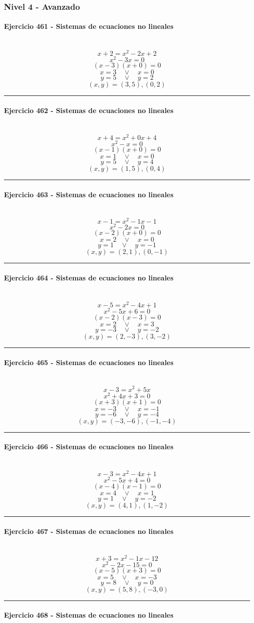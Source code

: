 \documentclass[10pt,a4paper]{article}
\newcommand{\res}[1]{\paragraph{#1}\mbox{}\\[-1.2em]}
\begin{document}
\subsubsection*{Nivel 4 - Avanzado}
\res{Ejercicio 461 - Sistemas de ecuaciones no lineales}
\[ x+2=x^2-2x+2 \]
\[ x^{2} - 3 x=0 \]
\[ (x-3)(x+0)=0 \]
\[ x=3\quad \vee \quad x=0 \]
\[ y=5\quad \vee \quad y=2 \]
\[ \boxed{(x,y)=(3,5),(0,2)} \]
\vspace{1mm}\hrule\vspace{2mm}
\res{Ejercicio 462 - Sistemas de ecuaciones no lineales}
\[ x+4=x^2+0x+4 \]
\[ x^{2} - x=0 \]
\[ (x-1)(x+0)=0 \]
\[ x=1\quad \vee \quad x=0 \]
\[ y=5\quad \vee \quad y=4 \]
\[ \boxed{(x,y)=(1,5),(0,4)} \]
\vspace{1mm}\hrule\vspace{2mm}
\res{Ejercicio 463 - Sistemas de ecuaciones no lineales}
\[ x-1=x^2-1x-1 \]
\[ x^{2} - 2 x=0 \]
\[ (x-2)(x+0)=0 \]
\[ x=2\quad \vee \quad x=0 \]
\[ y=1\quad \vee \quad y=-1 \]
\[ \boxed{(x,y)=(2,1),(0,-1)} \]
\vspace{1mm}\hrule\vspace{2mm}
\res{Ejercicio 464 - Sistemas de ecuaciones no lineales}
\[ x-5=x^2-4x+1 \]
\[ x^{2} - 5 x + 6=0 \]
\[ (x-2)(x-3)=0 \]
\[ x=2\quad \vee \quad x=3 \]
\[ y=-3\quad \vee \quad y=-2 \]
\[ \boxed{(x,y)=(2,-3),(3,-2)} \]
\vspace{1mm}\hrule\vspace{2mm}
\res{Ejercicio 465 - Sistemas de ecuaciones no lineales}
\[ x-3=x^2+5x \]
\[ x^{2} + 4 x + 3=0 \]
\[ (x+3)(x+1)=0 \]
\[ x=-3\quad \vee \quad x=-1 \]
\[ y=-6\quad \vee \quad y=-4 \]
\[ \boxed{(x,y)=(-3,-6),(-1,-4)} \]
\vspace{1mm}\hrule\vspace{2mm}
\res{Ejercicio 466 - Sistemas de ecuaciones no lineales}
\[ x-3=x^2-4x+1 \]
\[ x^{2} - 5 x + 4=0 \]
\[ (x-4)(x-1)=0 \]
\[ x=4\quad \vee \quad x=1 \]
\[ y=1\quad \vee \quad y=-2 \]
\[ \boxed{(x,y)=(4,1),(1,-2)} \]
\vspace{1mm}\hrule\vspace{2mm}
\res{Ejercicio 467 - Sistemas de ecuaciones no lineales}
\[ x+3=x^2-1x-12 \]
\[ x^{2} - 2 x - 15=0 \]
\[ (x-5)(x+3)=0 \]
\[ x=5\quad \vee \quad x=-3 \]
\[ y=8\quad \vee \quad y=0 \]
\[ \boxed{(x,y)=(5,8),(-3,0)} \]
\vspace{1mm}\hrule\vspace{2mm}
\res{Ejercicio 468 - Sistemas de ecuaciones no lineales}
\end{document}
